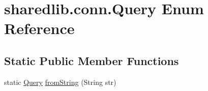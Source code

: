 \hypertarget{enumsharedlib_1_1conn_1_1_query}{}\section{sharedlib.\+conn.\+Query Enum Reference}
\label{enumsharedlib_1_1conn_1_1_query}
\subsection*{Static Public Member Functions}
\begin{DoxyCompactItemize}
\item 
static \hyperlink{enumsharedlib_1_1conn_1_1_query}{Query} \hyperlink{enumsharedlib_1_1conn_1_1_query_a1b8a9273d718763c0bc54aae01d26d16}{from\+String} (String str)
\end{DoxyCompactItemize}
